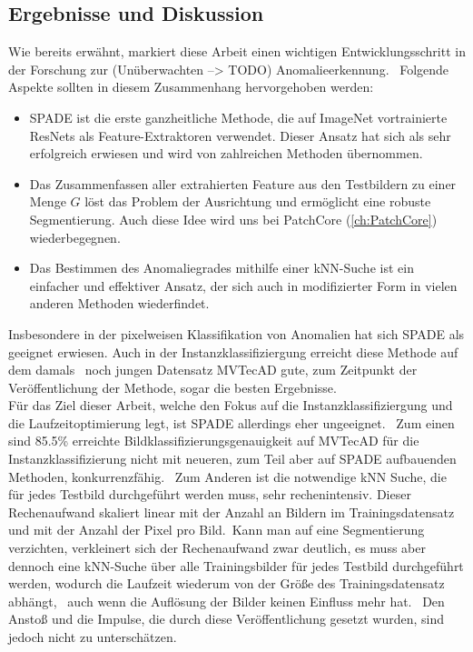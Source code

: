 \subsection{Ergebnisse und Diskussion}\label{subsec:SPADEResults}
Wie bereits erwähnt, markiert diese Arbeit einen wichtigen Entwicklungsschritt in der Forschung zur (Unüberwachten --> TODO) Anomalieerkennung. \
Folgende Aspekte sollten in diesem Zusammenhang hervorgehoben werden:
\begin{itemize}
  \item SPADE ist die erste ganzheitliche Methode, die auf ImageNet vortrainierte ResNets als Feature-Extraktoren verwendet. Dieser Ansatz hat sich als sehr erfolgreich erwiesen und wird von zahlreichen Methoden übernommen. \
  \item Das Zusammenfassen aller extrahierten Feature aus den Testbildern zu einer Menge $G$ löst das Problem der Ausrichtung und ermöglicht eine robuste Segmentierung. Auch diese Idee wird uns bei PatchCore (\ref{ch:PatchCore}) wiederbegegnen.\
  \item Das Bestimmen des Anomaliegrades mithilfe einer kNN-Suche ist ein einfacher und effektiver Ansatz, der sich auch in modifizierter Form in vielen anderen Methoden wiederfindet.\
\end{itemize}
Insbesondere in der pixelweisen Klassifikation von Anomalien hat sich SPADE als geeignet erwiesen. Auch in der Instanzklassifiziergung erreicht diese Methode auf dem damals \
noch jungen Datensatz MVTecAD gute, zum Zeitpunkt der Veröffentlichung der Methode, sogar die besten Ergebnisse.\\
Für das Ziel dieser Arbeit, welche den Fokus auf die Instanzklassifiziergung und die Laufzeitoptimierung legt, ist SPADE allerdings eher ungeeignet. \
Zum einen sind \num{85,5}\% erreichte Bildklassifizierungsgenauigkeit auf MVTecAD für die Instanzklassifizierung nicht mit neueren, zum Teil aber auf SPADE aufbauenden Methoden, konkurrenzfähig. \
Zum Anderen ist die notwendige kNN Suche, die für jedes Testbild durchgeführt werden muss, sehr rechenintensiv. Dieser Rechenaufwand skaliert linear mit der Anzahl an Bildern im Trainingsdatensatz und mit der Anzahl der Pixel pro Bild.\
Kann man auf eine Segmentierung verzichten, verkleinert sich der Rechenaufwand zwar deutlich, es muss aber dennoch eine kNN-Suche über alle Trainingsbilder für jedes Testbild durchgeführt werden, wodurch die Laufzeit wiederum von der Größe des Trainingsdatensatz abhängt, \ 
auch wenn die Auflösung der Bilder keinen Einfluss mehr hat. \
Den Anstoß und die Impulse, die durch diese Veröffentlichung gesetzt wurden, sind jedoch nicht zu unterschätzen. \

